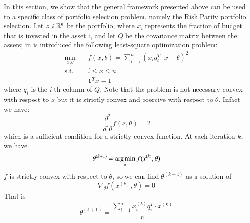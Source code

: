 In this section, we show that the general framework presented above can be used to a specific class of portfolio selection problem, namely the Risk Parity portfolio selection. Let $x \in \mathbb{R}^n$ be the portfolio, where $x_i$ represents the fraction of budget that is invested in the asset $i$, and let $Q$ be the covariance matrix between the assets; in \cite{bai} is introduced the following least-square optimization problem:
\begin{subequations}\label{eq:riskparity} 
\begin{align}
\min_{x,\theta} & \quad f(x,\theta) = \sum_{i=i}^n \left({x_i q_i^T \cdot x} - \theta \right)^2\\
\text{s.t.} & \quad l \leq x \leq u \\
& \quad \mathbf{1}^T x = 1 
\end{align}
\end{subequations}
where $q_i$ is the $i$-th column of $Q$. Note that the problem is not necessary convex with respect to $x$ but it is strictly convex and coercive with respect to $\theta$. Infact we have:
\begin{equation}
\frac{\partial^2}{d^2\theta} f(x,\theta) = 2 
\end{equation}
which is a sufficient condition for a strictly convex function. At each iteration $k$, we have 
\begin{equation}
\theta^{(k+1)} = \operatorname*{arg\,min}_\theta f(x^{(k)},\theta)
\end{equation}
$f$ is strictly convex with respect to $\theta$, so we can find $\theta^{(k+1)}$ as a solution of
\begin{equation}
\nabla_\theta f(x^{(k)},\theta) = 0 
\end{equation}
That is
\begin{equation}
\theta^{(k+1)} = \frac{\sum_{i=1}^n x_i^{(k)} q_i^T \cdot x^{(k)}}{n}
\end{equation}